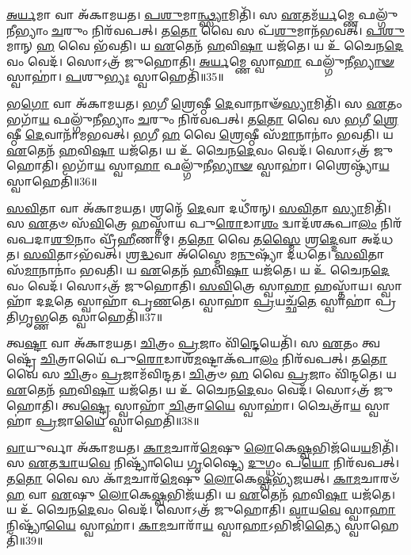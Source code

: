 \-\ul{𑌅}\-\-\ul{𑌰𑍍𑌯}\-𑌮𑌾 𑌵𑌾 𑌅᳴𑌕𑌾𑌮𑌯𑌤।
\-\ul{𑌪}\-\-\ul{𑌶𑍁}\-𑌮𑌾\-\ul{𑌨𑍍𑌥𑍍𑌸𑍍𑌯𑌾}\-𑌮𑌿𑌤𑌿᳴।
𑌸 \ul{𑌏}\-𑌤𑌮᳴\-\ul{𑌰𑍍𑌯}\-𑌮𑍍𑌣𑍇 𑌫𑌲𑍍𑌗𑍁᳴𑌨𑍀𑌭𑍍𑌯𑌾𑌂 \ul{𑌚}\-𑌰𑍁𑌂 𑌨𑌿𑌰᳴𑌵𑌪𑌤𑍍।
𑌤\-\ul{𑌤𑍋} 𑌵𑍈 𑌸 𑌪᳴\-\ul{𑌶𑍁}\-𑌮𑌾𑌨᳴𑌭𑌵𑌤𑍍।
\-\ul{𑌪}\-\-\ul{𑌶𑍁}\-𑌮𑌾𑌨𑍍 \ul{𑌹} 𑌵𑍈 𑌭᳴𑌵𑌤𑌿।
𑌯 \ul{𑌏}\-𑌤𑍇𑌨᳴ \ul{𑌹}\-𑌵𑌿\-\ul{𑌷𑌾} 𑌯𑌜᳴𑌤𑍇।
𑌯 𑌉᳴ 𑌚𑍈𑌨\-\ul{𑌦𑍇}\-𑌵𑌂 𑌵𑍇𑌦᳴।
𑌸𑍋𑌽𑌤𑍍𑌰᳴ 𑌜𑍁𑌹𑍋𑌤𑌿।
\-\ul{𑌅}\-\-\ul{𑌰𑍍𑌯}\-𑌮𑍍𑌣𑍇 𑌸𑍍𑌵𑌾\-\ul{𑌹𑌾} 𑌫𑌲𑍍𑌗𑍁᳴𑌨𑍀\-\ul{𑌭𑍍𑌯𑌾}\-\-\ul{𑍟} 𑌸𑍍𑌵𑌾𑌹𑌾॑।
\-\ul{𑌪}\-𑌶𑍁\-\ul{𑌭𑍍𑌯𑌃} 𑌸𑍍𑌵𑌾𑌹𑍇𑌤𑌿᳴॥35॥

𑌭\-\ul{𑌗𑍋} 𑌵𑌾 𑌅᳴𑌕𑌾𑌮𑌯𑌤।
\-\ul{𑌭}\-𑌗𑍀 \ul{𑌶𑍍𑌰𑍇}\-𑌷𑍍𑌠𑍀 \ul{𑌦𑍇}\-𑌵𑌾𑌨𑌾𑍟᳴\-\ul{𑌸𑍍𑌯𑌾}\-𑌮𑌿𑌤𑌿᳴।
𑌸 \ul{𑌏}\-𑌤𑌂 𑌭𑌗𑌾᳴\-\ul{𑌯} 𑌫𑌲𑍍𑌗𑍁᳴𑌨𑍀𑌭𑍍𑌯𑌾𑌂 \ul{𑌚}\-𑌰𑍁𑌂 𑌨𑌿𑌰᳴𑌵𑌪𑌤𑍍।
𑌤\-\ul{𑌤𑍋} 𑌵𑍈 𑌸 \ul{𑌭}\-𑌗𑍀 \ul{𑌶𑍍𑌰𑍇}\-𑌷𑍍𑌠𑍀 \ul{𑌦𑍇}\-𑌵𑌾𑌨𑌾᳴𑌮𑌭𑌵𑌤𑍍।
\-\ul{𑌭}\-𑌗𑍀 \ul{𑌹} 𑌵𑍈 \ul{𑌶𑍍𑌰𑍇}\-𑌷𑍍𑌠𑍀 𑌸᳴\-\ul{𑌮𑌾}\-𑌨𑌾𑌨𑌾𑌂॑ 𑌭𑌵𑌤𑌿।
𑌯 \ul{𑌏}\-𑌤𑍇𑌨᳴ \ul{𑌹}\-𑌵𑌿\-\ul{𑌷𑌾} 𑌯𑌜᳴𑌤𑍇।
𑌯 𑌉᳴ 𑌚𑍈𑌨\-\ul{𑌦𑍇}\-𑌵𑌂 𑌵𑍇𑌦᳴।
𑌸𑍋𑌽𑌤𑍍𑌰᳴ 𑌜𑍁𑌹𑍋𑌤𑌿।
𑌭𑌗𑌾᳴\-\ul{𑌯} 𑌸𑍍𑌵𑌾\-\ul{𑌹𑌾} 𑌫𑌲𑍍𑌗𑍁᳴𑌨𑍀\-\ul{𑌭𑍍𑌯𑌾}\-\-\ul{𑍟} 𑌸𑍍𑌵𑌾𑌹𑌾॑।
𑌶𑍍𑌰𑍈𑌷𑍍𑌠𑍍𑌯𑌾᳴\-\ul{𑌯} 𑌸𑍍𑌵𑌾𑌹𑍇𑌤𑌿᳴॥36॥

\-\ul{𑌸}\-\-\ul{𑌵𑌿}\-𑌤𑌾 𑌵𑌾 𑌅᳴𑌕𑌾𑌮𑌯𑌤।
𑌶𑍍𑌰𑌨𑍍𑌮𑍇᳴ \ul{𑌦𑍇}\-𑌵𑌾 𑌦𑌧𑍀᳴𑌰𑌨𑍍।
\-\ul{𑌸}\-\-\ul{𑌵𑌿}\-𑌤𑌾 \ul{𑌸𑍍𑌯𑌾}\-𑌮𑌿𑌤𑌿᳴।
𑌸 \ul{𑌏}\-𑌤𑍞 𑌸᳴\-\ul{𑌵𑌿}\-𑌤𑍍𑌰𑍇 𑌹𑌸𑍍𑌤𑌾᳴𑌯 𑌪𑍁\-\ul{𑌰𑍋}\-𑌡𑌾\-\ul{𑌶𑌂} 𑌦𑍍𑌵𑌾𑌦᳴𑌶𑌕𑌪𑌾\-\ul{𑌲𑌂} 𑌨𑌿𑌰᳴𑌵𑌪𑌦𑌾\-\ul{𑌶𑍂}\-𑌨𑌾𑌂 𑌵𑍍𑌰𑍀᳴\-\ul{𑌹𑍀}\-𑌣𑌾𑌮𑍍।
𑌤\-\ul{𑌤𑍋} 𑌵𑍈 𑌤\-\ul{𑌸𑍍𑌮𑍈} 𑌶𑍍𑌰\-\ul{𑌦𑍍𑌦𑍇}\-𑌵𑌾 𑌅𑌦᳴𑌧𑌤।
\-\ul{𑌸}\-\-\ul{𑌵𑌿}\-𑌤𑌾\-𑌽𑌭᳴𑌵𑌤𑍍।
𑌶𑍍𑌰\-\ul{𑌦𑍍𑌧}\-𑌵𑌾 𑌅᳴𑌸𑍍𑌮𑍈 𑌮\-\ul{𑌨𑍁}\-𑌷𑍍𑌯𑌾᳴ 𑌦𑌧𑌤𑍇।
\-\ul{𑌸}\-\-\ul{𑌵𑌿}\-𑌤𑌾 𑌸᳴\-\ul{𑌮𑌾}\-𑌨𑌾𑌨𑌾𑌂॑ 𑌭𑌵𑌤𑌿।
𑌯 \ul{𑌏}\-𑌤𑍇𑌨᳴ \ul{𑌹}\-𑌵𑌿\-\ul{𑌷𑌾} 𑌯𑌜᳴𑌤𑍇।
𑌯 𑌉᳴ 𑌚𑍈𑌨\-\ul{𑌦𑍇}\-𑌵𑌂 𑌵𑍇𑌦᳴।
𑌸𑍋𑌽𑌤𑍍𑌰᳴ 𑌜𑍁𑌹𑍋𑌤𑌿।
\-\ul{𑌸}\-\-\ul{𑌵𑌿}\-𑌤𑍍𑌰𑍇 𑌸𑍍𑌵𑌾\-\ul{𑌹𑌾} 𑌹𑌸𑍍𑌤𑌾᳴𑌯।
𑌸𑍍𑌵𑌾𑌹𑌾᳴ 𑌦\-\ul{𑌦}\-𑌤𑍇 𑌸𑍍𑌵𑌾𑌹𑌾᳴ 𑌪𑍃\-\ul{𑌣}\-𑌤𑍇।
𑌸𑍍𑌵𑌾𑌹𑌾॑ \ul{𑌪𑍍𑌰}\-𑌯𑌚𑍍𑌛᳴\-\ul{𑌤𑍇} 𑌸𑍍𑌵𑌾𑌹𑌾॑ 𑌪𑍍𑌰𑌤𑌿𑌗𑍃\-\ul{𑌭𑍍𑌣}\-𑌤𑍇 𑌸𑍍𑌵𑌾𑌹𑍇𑌤𑌿᳴॥37॥

𑌤𑍍𑌵\-\ul{𑌷𑍍𑌟𑌾} 𑌵𑌾 𑌅᳴𑌕𑌾𑌮𑌯𑌤।
\-\ul{𑌚𑌿}\-𑌤𑍍𑌰𑌂 \ul{𑌪𑍍𑌰}\-𑌜𑌾𑌂 𑌵𑌿᳴\-\ul{𑌨𑍍𑌦𑍇}\-𑌯𑍇𑌤𑌿᳴।
𑌸 \ul{𑌏}\-𑌤𑌂 𑌤𑍍𑌵𑌷𑍍𑌟𑍍𑌰𑍇᳴ \ul{𑌚𑌿}\-𑌤𑍍𑌰𑌾𑌯𑍈᳴ 𑌪𑍁\-\ul{𑌰𑍋}\-𑌡𑌾𑌶᳴\-\ul{𑌮}\-𑌷𑍍𑌟𑌾\-𑌕᳴𑌪𑌾\-\ul{𑌲𑌂} 𑌨𑌿𑌰᳴𑌵𑌪𑌤𑍍।
𑌤\-\ul{𑌤𑍋} 𑌵𑍈 𑌸 \ul{𑌚𑌿}\-𑌤𑍍𑌰𑌂 \ul{𑌪𑍍𑌰}\-𑌜𑌾𑌮᳴𑌵𑌿𑌨𑍍𑌦𑌤।
\-\ul{𑌚𑌿}\-𑌤𑍍𑌰𑍞 \ul{𑌹} 𑌵𑍈 \ul{𑌪𑍍𑌰}\-𑌜𑌾𑌂 𑌵𑌿᳴𑌨𑍍𑌦𑌤𑍇।
𑌯 \ul{𑌏}\-𑌤𑍇𑌨᳴ \ul{𑌹}\-𑌵𑌿\-\ul{𑌷𑌾} 𑌯𑌜᳴𑌤𑍇।
𑌯 𑌉᳴ 𑌚𑍈𑌨\-\ul{𑌦𑍇}\-𑌵𑌂 𑌵𑍇𑌦᳴।
𑌸𑍋𑌽𑌤𑍍𑌰᳴ 𑌜𑍁𑌹𑍋𑌤𑌿।
𑌤𑍍𑌵\-\ul{𑌷𑍍𑌟𑍍𑌰𑍇} 𑌸𑍍𑌵𑌾𑌹𑌾᳴ \ul{𑌚𑌿}\-𑌤𑍍𑌰𑌾\-\ul{𑌯𑍈} 𑌸𑍍𑌵𑌾𑌹𑌾॑।
𑌚𑍈𑌤𑍍𑌰𑌾᳴\-\ul{𑌯} 𑌸𑍍𑌵𑌾𑌹𑌾॑ \ul{𑌪𑍍𑌰}\-𑌜𑌾\-\ul{𑌯𑍈} 𑌸𑍍𑌵𑌾𑌹𑍇𑌤𑌿᳴॥38॥

\-\ul{𑌵𑌾}\-𑌯𑍁𑌰𑍍𑌵𑌾 𑌅᳴𑌕𑌾𑌮𑌯𑌤।
\-\ul{𑌕𑌾}\-\-\ul{𑌮}\-𑌚𑌾𑌰᳴\-\ul{𑌮𑍇}\-𑌷𑍁 \ul{𑌲𑍋}\-𑌕𑍇\-\ul{𑌷𑍍𑌵}\-𑌭𑌿𑌜᳴𑌯𑍇\-\ul{𑌯}\-𑌮𑌿𑌤𑌿᳴।
𑌸 \ul{𑌏}\-𑌤\-\ul{𑌦𑍍𑌵𑌾}\-𑌯\-\ul{𑌵𑍇} 𑌨𑌿𑌷𑍍𑌟𑍍𑌯𑌾᳴𑌯𑍈 \ul{𑌗𑍃}\-𑌷𑍍𑌟𑍍𑌯𑍈 \ul{𑌦𑍁}\-𑌗𑍍𑌧𑌂 𑌪\-\ul{𑌯𑍋} 𑌨𑌿𑌰᳴𑌵𑌪𑌤𑍍।
𑌤\-\ul{𑌤𑍋} 𑌵𑍈 𑌸 𑌕𑌾᳴\-\ul{𑌮}\-𑌚𑌾𑌰᳴\-\ul{𑌮𑍇}\-𑌷𑍁 \ul{𑌲𑍋}\-𑌕𑍇\-\ul{𑌷𑍍𑌵}\-𑌭𑍍𑌯᳴𑌜𑌯𑌤𑍍।
\-\ul{𑌕𑌾}\-\-\ul{𑌮}\-𑌚𑌾𑌰𑍞᳴ \ul{𑌹} 𑌵𑌾 \ul{𑌏}\-𑌷𑍁 \ul{𑌲𑍋}\-𑌕𑍇\-\ul{𑌷𑍍𑌵}\-𑌭𑌿𑌜᳴𑌯𑌤𑌿।
𑌯 \ul{𑌏}\-𑌤𑍇𑌨᳴ \ul{𑌹}\-𑌵𑌿\-\ul{𑌷𑌾} 𑌯𑌜᳴𑌤𑍇।
𑌯 𑌉᳴ 𑌚𑍈𑌨\-\ul{𑌦𑍇}\-𑌵𑌂 𑌵𑍇𑌦᳴।
𑌸𑍋𑌽𑌤𑍍𑌰᳴ 𑌜𑍁𑌹𑍋𑌤𑌿।
\-\ul{𑌵𑌾}\-𑌯\-\ul{𑌵𑍇} 𑌸𑍍𑌵𑌾\-\ul{𑌹𑌾} 𑌨𑌿𑌷𑍍𑌟𑍍𑌯𑌾᳴\-\ul{𑌯𑍈} 𑌸𑍍𑌵𑌾𑌹𑌾॑।
\-\ul{𑌕𑌾}\-\-\ul{𑌮}\-𑌚𑌾𑌰𑌾᳴\-\ul{𑌯} 𑌸𑍍𑌵𑌾\-\ul{𑌹𑌾}\-\-𑌽𑌭𑌿𑌜𑌿᳴\-\ul{𑌤𑍍𑌯𑍈} 𑌸𑍍𑌵𑌾𑌹𑍇𑌤𑌿᳴॥39॥

